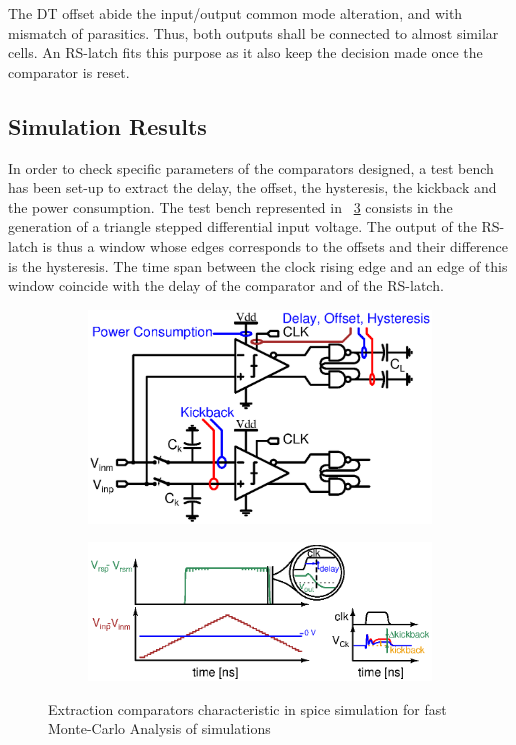 The DT offset abide the input/output common mode alteration, and with mismatch of parasitics. Thus, both outputs shall be connected to almost similar cells. An RS-latch fits this purpose as it also keep the decision made once the comparator is reset.

    \subsection{Simulation Results}              %
\label{sec:latches_sim}
In order to check specific parameters of the comparators designed, a test bench has been set-up to extract the delay, the offset, the hysteresis, the kickback and the power consumption. The test bench represented in \figurename~\ref{fig:cmp_testbench} consists in the generation of a triangle stepped differential input voltage. The output of the RS-latch is thus a window whose edges corresponds to the offsets and their difference is the hysteresis. The time span between the clock rising edge and an edge of this window coincide with the delay of the comparator and of the RS-latch. 

\begin{figure}[htp]
    \centering
    \begin{subfigure}[b]{0.40\textwidth}
        \centering
        \includegraphics[width=\textwidth]{Chapter7/Figs/cmp_tb.ps}
        \label{fig:cmp_tb}
    \end{subfigure}
    \begin{subfigure}[b]{0.58\textwidth}
        \centering
        \includegraphics[width=\textwidth]{Chapter7/Figs/cmp_tb_signals.ps}
        \label{fig:test_signals}
    \end{subfigure}
    \caption{Extraction comparators characteristic in spice simulation for fast Monte-Carlo Analysis of simulations}
    \label{fig:cmp_testbench}
\end{figure}

